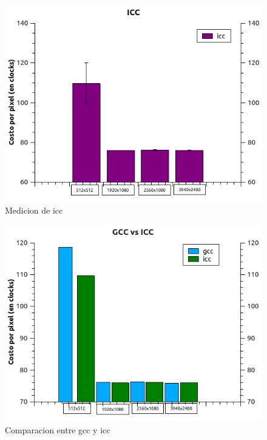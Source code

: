 \begin{figure}[H]
\begin{center}
  \includegraphics[width=\linewidth]{tiemposCompiladores/icc.png}
  \caption{{\small Medicion de icc}} 
\endminipage
\end{center}
\end{figure}

\begin{figure}[H]
\begin{center}
  \includegraphics[width=\linewidth]{tiemposCompiladores/gccVsIcc.png}
  \caption{{\small Comparacion entre gcc y icc}} 
\endminipage
\end{center}
\end{figure}

